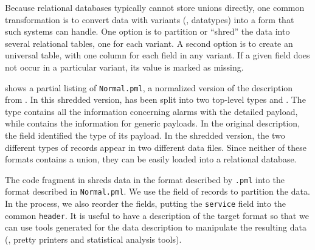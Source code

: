 Because relational databases typically cannot store unions directly,
one common transformation is to convert data with variants (\ie{},
datatypes) into a form that such systems can handle.  One option is to
partition or ``shred'' the data into several relational tables, one
for each variant.  A second option is to create an universal table,
with one column for each field in any variant.  If a given field does
not occur in a particular variant, its value is marked as missing.

 shows a partial listing of
\texttt{\darkstar{}Normal.pml}, a normalized version of the
\darkstar{} description from . In this
shredded version,  has been split into two top-level types
 and .  The type  contains all
the information concerning alarms with the detailed payload, while
 contains the information for generic payloads.  In the
original description, the  field identified the type of its
payload.  In the shredded version, the two different types of records
appear in two different data files. Since neither of these formats
contains a union, they can be easily loaded into a relational
database.

The code fragment in  shreds \darkstar{}
data in the format described by \texttt{\darkstar{}.pml} into the
format described in \texttt{\darkstar{}Normal.pml}.  We use the
 field of  records to partition the data. In the
process, we also reorder the fields, putting the \texttt{service}
field into the common \texttt{header}.  It is useful to have a
\padsml{} description of the target format so that we can use tools
generated for the data description to manipulate the resulting data
(\eg{}, pretty printers and statistical analysis tools).

